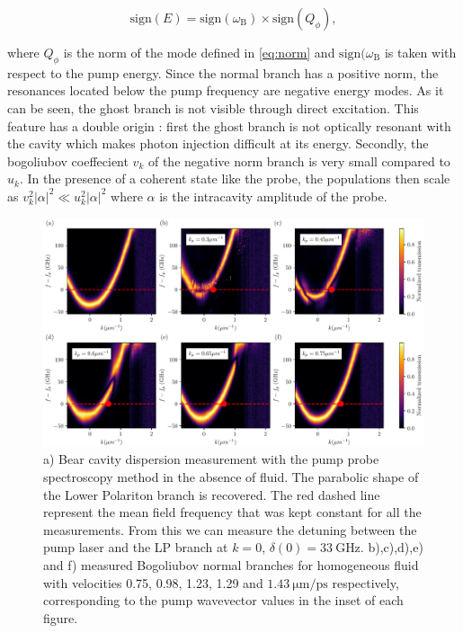  \begin{equation}
    \mathrm{sign}(E)=\mathrm{sign}(\omega_\mathrm{B})\times \mathrm{sign}(Q_{\phi}),
 \end{equation}
 
where $Q_{\phi}$ is the norm of the mode defined in \autoref{eq:norm} and $\mathrm{sign}(\omega_\mathrm{B}$ is taken with respect to the pump energy. Since the normal branch has a positive norm, the resonances located
below the pump frequency are negative energy modes. As it can be seen, the ghost branch is not visible through direct excitation. This feature has a double origin : first the ghost branch is not optically resonant with the cavity which makes photon injection difficult at its energy. Secondly,
the bogoliubov coeffecient $v_k$ of the negative norm branch is very small compared to $u_k$.  In the presence of
a coherent state like the probe, the populations then scale as $v_k^2 |\alpha|^2\ll u_k^2|\alpha|^2$ where $\alpha$ is the intracavity amplitude of the probe. 

\begin{figure}[h!]
    \centering
    \includegraphics[width=1\textwidth]{chap3_custom_st/fig/homogeneous_doppler.pdf}
    \caption{a) Bear cavity dispersion measurement with the pump probe spectroscopy method in the absence of fluid. 
    The parabolic shape of the Lower Polariton branch is recovered.  
    The red dashed line represent the mean field frequency that was kept constant for all the measurements. 
    From this we can measure the detuning between the pump laser and the LP branch at $k=0$,
     $\delta(0) = \SI{33}{\giga\hertz}$. b),c),d),e) and f) measured Bogoliubov normal branches for homogeneous fluid with velocities 0.75, 0.98, 1.23, 1.29 and $\SI{1.43}{\micro \meter \per \pico \second}$ respectively, corresponding 
    to the pump wavevector values in the inset of each figure.}
     
    \label{fig:homogeneous_fluid_bogo}
\end{figure}


